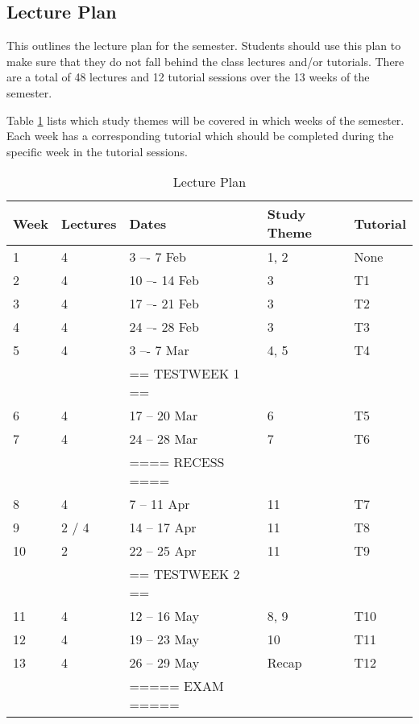     \subsection{Lecture Plan}
        This outlines the lecture plan for the semester. Students should use
        this plan to make sure that they do not fall behind the class
        lectures and/or tutorials. There are a total of 48 lectures and 12
        tutorial sessions over the 13 weeks of the semester.

        Table \ref{tab:lec_plan} lists which study themes will be covered
        in which weeks of the semester. Each week has a corresponding tutorial
        which should be completed during the specific week in the tutorial
        sessions.

        \begin{table}[!h]
            \begin{center}
             \begin{tabular}{|l|l|l|l|l|}
                 \hline
                 {\bf Week} & {\bf Lectures} & {\bf Dates} & %
                 {\bf Study Theme} & {\bf Tutorial} \\
                 \hline
                 1  & 4     &  3 –-  7 Feb     & 1, 2  & None \\
                 2  & 4     & 10 –- 14 Feb     & 3     & T1 \\
                 3  & 4     & 17 –- 21 Feb     & 3     & T2 \\
                 4  & 4     & 24 –- 28 Feb     & 3     & T3 \\
                 5  & 4     &  3 –-  7 Mar     & 4, 5  & T4 \\
                    &       & == TESTWEEK 1 == &       & \\
                 6  & 4     & 17 -- 20 Mar     & 6     & T5 \\
                 7  & 4     & 24 -- 28 Mar     & 7     & T6 \\
                    &       & ==== RECESS ==== &       & \\
                 8  & 4     &  7 -- 11 Apr     & 11    & T7 \\
                 9  & 2 / 4 & 14 -- 17 Apr     & 11    & T8 \\
                 10 & 2     & 22 -- 25 Apr     & 11    & T9 \\
                    &       & == TESTWEEK 2 == &       & \\
                 11 & 4     & 12 -- 16 May     & 8, 9  & T10 \\
                 12 & 4     & 19 -- 23 May     & 10    & T11 \\
                 13 & 4     & 26 -- 29 May     & Recap & T12 \\
                    &       & ===== EXAM ===== &       & \\
                 \hline
             \end{tabular}
             \caption{Lecture Plan} \label{tab:lec_plan}
            \end{center}
        \end{table}

